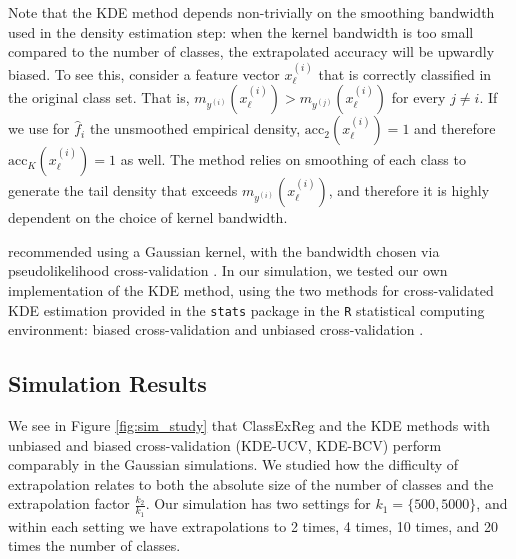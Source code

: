 \documentclass[twoside,11pt]{article}
\begin{document}
Note that the KDE method depends non-trivially on the smoothing bandwidth used in the density estimation step: when the kernel bandwidth is too small compared to the number of classes, the extrapolated accuracy will be upwardly biased.  To see
this, consider a feature vector $x^{(i)}_\ell$ that is correctly classified in the original class set. That is, $m_{y^{(i)}}(x^{(i)}_\ell)>m_{y^{(j)}}(x^{(i)}_\ell)$ for every
$j\neq i$. If we use for $\hat{f}_i$ the unsmoothed empirical density,
$\mathrm{acc}_2(x^{(i)}_\ell)=1$ and therefore $\mathrm{acc}_K(x^{(i)}_\ell) = 1$ as well. The method relies on smoothing of each class to generate the tail density that exceeds $m_{y^{(i)}}(x^{(i)}_\ell)$, and therefore it is highly dependent on the choice of kernel bandwidth. 

\cite{Kay2008a} recommended using a Gaussian
kernel, with the bandwidth chosen via pseudolikelihood cross-validation \citep{cao1994comparative}.
In our simulation, we tested our own implementation of the KDE method,
using the two methods for cross-validated KDE estimation provided in
the {\tt stats} package in the {\tt R} statistical computing
environment: biased cross-validation and unbiased cross-validation \citep{Scott1992}.


\subsection{Simulation Results}

We see in Figure \ref{fig:sim_study} that ClassExReg and the KDE methods with unbiased and biased
cross-validation (KDE-UCV, KDE-BCV) perform comparably in the Gaussian
simulations.  We studied how the difficulty of extrapolation relates to both the
absolute size of the number of classes and the extrapolation factor $\frac{k_2}{k_1}$.  Our simulation has two settings for $k_1 = \{500,5000\}$, and
within each setting we have extrapolations to 2 times, 4 times, 10
times, and 20 times the number of classes.
\end{document}
